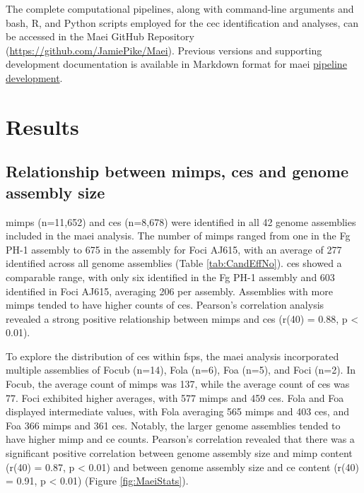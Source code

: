 The complete computational pipelines, along with command-line arguments and bash, R, and Python scripts employed for the \ac{cec} identification and analyses, can be accessed in the Maei GitHub Repository (\href{https://github.com/JamiePike/Maei}{https://github.com/JamiePike/Maei}). Previous versions and supporting development documentation is available in Markdown format for \ac{maei} \href{https://github.com/JamiePike/Maei/tree/main/dev}{pipeline development}.

\newpage
\section{Results}

\subsection{Relationship between \acp{mimp}, \acp{ce} and genome assembly size}

\Acp{mimp} (n=11,652) and \acfp{ce} (n=8,678) were identified in all 42 genome assemblies included in the \ac{maei} analysis. The number of \acp{mimp} ranged from one in the \ac{Fg} PH-1 assembly to 675 in the assembly for \ac{Foci} AJ615, with an average of 277 identified across all genome assemblies (Table \ref{tab:CandEffNo}). \Acp{ce} showed a comparable range, with only six identified in the \ac{Fg} PH-1 assembly and 603 identified in \ac{Foci} AJ615, averaging 206 per assembly. Assemblies with more \acp{mimp} tended to have higher counts of \acp{ce}. Pearson's correlation analysis revealed a strong positive relationship between \acp{mimp} and \acp{ce} (r(40) = 0.88, p < 0.01). 



To explore the distribution of \acp{ce} within \acp{fsp}, the \ac{maei} analysis incorporated multiple assemblies of \ac{Focub} (n=14), \ac{Fola} (n=6), \ac{Foa} (n=5), and \ac{Foci} (n=2). In \ac{Focub}, the average count of \acp{mimp} was 137, while the average count of \acp{ce} was 77. \ac{Foci} exhibited higher averages, with 577 \acp{mimp} and 459 \acp{ce}. \ac{Fola} and \ac{Foa} displayed intermediate values, with \ac{Fola} averaging 565 \acp{mimp} and 403 \acp{ce}, and \ac{Foa} 366 \acp{mimp} and 361 \acp{ce}. Notably, the larger genome assemblies tended to have higher \ac{mimp} and \ac{ce} counts. Pearson's correlation revealed that there was a significant positive correlation between genome assembly size and \ac{mimp} content (r(40) = 0.87, p < 0.01) and between genome assembly size and \ac{ce} content (r(40) = 0.91, p < 0.01) (Figure \ref{fig:MaeiStats}). 

